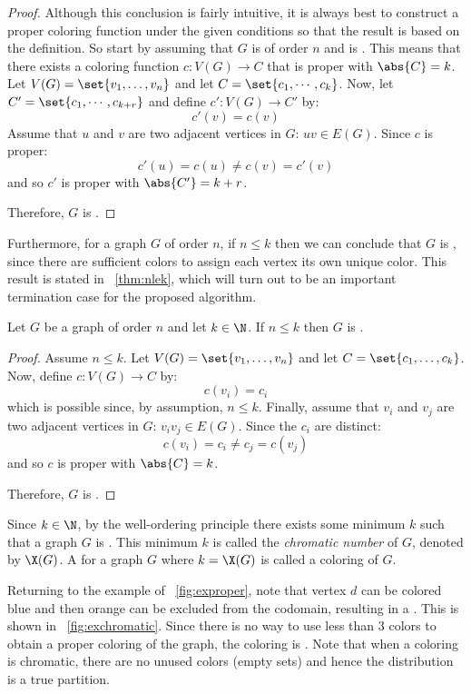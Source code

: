 \begin{proof}
  Although this conclusion is fairly intuitive, it is always best to construct a proper coloring function under the
  given conditions so that the result is based on the definition.  So start by assuming that \(G\) is of order
  \(n\) and is .  This means that there exists a coloring function \(c:V(G)\to C\) that is proper with
  \(\abs{C}=k\).  Let \(V(G)=\set{v_1,\ldots,v_n}\) and let \(C=\set{c_1,\cdots,c_k}\).  Now, let
  \(C'=\set{c_1,\cdots,c_{k+r}}\) and define \(c':V(G)\to C'\) by:
  \[c'(v)=c(v)\]
  Assume that \(u\) and \(v\) are two adjacent vertices in \(G\): \(uv\in E(G)\).  Since \(c\) is proper:
  \[c'(u)=c(u)\ne c(v)=c'(v)\]
  and so \(c'\) is proper with \(\abs{C'}=k+r\).

  Therefore, \(G\) is .
\end{proof}

Furthermore, for a graph \(G\) of order \(n\), if \(n\le k\) then we can conclude that \(G\) is ,
since there are sufficient colors to assign each vertex its own unique color.  This result is stated in
\theoremname~\ref{thm:nlek}, which will turn out to be an important termination case for the proposed algorithm.

\begin{theorem}
  \label{thm:nlek}
  Let \(G\) be a graph of order \(n\) and let \(k\in\N\).  If \(n\le k\) then \(G\) is .
\end{theorem}

\begin{proof}
  Assume \(n\le k\).  Let \(V(G)=\set{v_1,\ldots,v_n}\) and let \(C=\set{c_1,\ldots,c_k}\).  Now, define
  \(c:V(G)\to C\) by:
  \[c(v_i)=c_i\]
  which is possible since, by assumption, \(n\le k\).  Finally, assume that \(v_i\) and \(v_j\) are two adjacent
  vertices in \(G\): \(v_iv_j\in E(G)\).  Since the \(c_i\) are distinct:
  \[c(v_i)=c_i\ne c_j=c(v_j)\]
  and so \(c\) is proper with \(\abs{C}=k\).

  Therefore, \(G\) is .
\end{proof}

Since \(k\in\N\), by the well-ordering principle there exists some minimum \(k\) such that a graph \(G\) is
.  This minimum \(k\) is called the \emph{chromatic number} of \(G\), denoted by \(\X(G)\).  A
 for a graph \(G\) where \(k=\X(G)\) is called a \emph{} coloring of \(G\).

Returning to the example  of \figurename~\ref{fig:exproper}, note that vertex \(d\) can be colored blue
and then orange can be excluded from the codomain, resulting in a .  This is shown in
\figurename~\ref{fig:exchromatic}.  Since there is no way to use less than 3 colors to obtain a proper coloring of
the graph, the coloring is .  Note that when a coloring is chromatic, there are no unused colors
(empty sets) and hence the distribution is a true partition.

